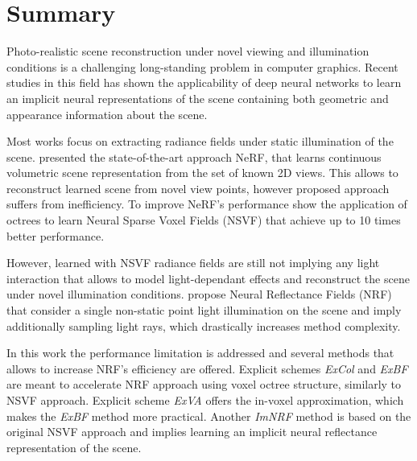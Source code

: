 

\chapter*{Summary}
\label{sec:summary}


Photo-realistic scene reconstruction under novel viewing and illumination conditions
is a challenging long-standing problem in computer graphics.
Recent studies in this field has shown the applicability of deep neural networks
to learn an implicit neural representations of the scene
containing both geometric and appearance information about the scene.

Most works focus on extracting radiance fields under static illumination of the scene.
\cite{mildenhall2020nerf} presented the state-of-the-art approach NeRF,
that learns continuous volumetric scene representation from the set of known 2D views.
This allows to reconstruct learned scene from novel view points,
however proposed approach suffers from inefficiency.
To improve NeRF's performance \cite{liu2021neural} show the application of octrees
to learn Neural Sparse Voxel Fields (NSVF) that achieve up to 10 times better performance.

However, learned with NSVF radiance fields are still not implying any light interaction that allows
to model light-dependant effects and reconstruct the scene under novel illumination conditions.
\cite{bi2020neural} propose Neural Reflectance Fields (NRF)
that consider a single non-static point light illumination on the scene
and imply additionally sampling light rays, which drastically increases method complexity.

In this work the performance limitation is addressed and several methods
that allows to increase NRF's efficiency are offered.
Explicit schemes \textit{ExCol} and \textit{ExBF} are meant to accelerate NRF approach
using voxel octree structure, similarly to NSVF approach.
Explicit scheme \textit{ExVA} offers the in-voxel approximation,
which makes the \textit{ExBF} method more practical.
Another \textit{ImNRF} method is based on the original NSVF approach
and implies learning an implicit neural reflectance representation of the scene.







